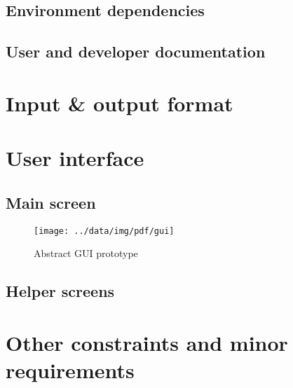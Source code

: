 \documentclass[10pt,a4paper,oneside]{article}
\begin{document}
\subsection{Environment dependencies}
\subsection{User and developer documentation}









\section{Input \& output format}













\section{User interface}

\subsection{Main screen}

\FloatBarrier
\begin{figure}
        \centering
        \texttt{[image: ../data/img/pdf/gui]}
        \caption{Abstract GUI prototype}
        \label{fig:gui}
\end{figure}
\FloatBarrier

\subsection{Helper screens}















\section{Other constraints and minor requirements}
\end{document}
